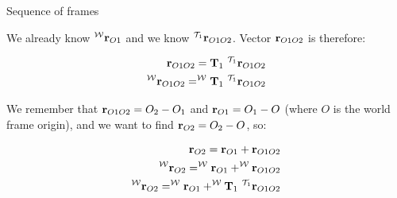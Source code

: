 \documentclass{beamer}
\begin{document}
\begin{frame}{Sequence of frames}
	\begin{flushleft}
		
		We already know $^{\mathcal W}\mathbf{r}_{O1}$ and we know $^{\mathcal T_1}\mathbf{r}_{O1O2}$. Vector $\mathbf{r}_{O1O2}$ is therefore:
		
		\begin{align}
			\mathbf{r}_{O1O2} = \mathbf T_1  \  ^{\mathcal T_1}\mathbf{r}_{O1O2} \\
			^{\mathcal W}\mathbf{r}_{O1O2} = ^{\mathcal W}\mathbf T_1  \  ^{\mathcal T_1}\mathbf{r}_{O1O2} 
		\end{align}
		
		We remember that $\mathbf{r}_{O1O2} = O_2 - O_1$ and $\mathbf{r}_{O1} = O_1 - O$ (where $O$ is the world frame origin), and we want to find $\mathbf{r}_{O2} = O_2 - O$, so:
		
		\begin{align}
			\mathbf{r}_{O2} = \mathbf{r}_{O1} + \mathbf{r}_{O1O2}
			 \\
			^{\mathcal W}\mathbf{r}_{O2} = ^{\mathcal W}\mathbf{r}_{O1} + ^{\mathcal W}\mathbf{r}_{O1O2}
			\\
			^{\mathcal W}\mathbf{r}_{O2} = ^{\mathcal W}\mathbf{r}_{O1} + ^{\mathcal W}\mathbf T_1  \  ^{\mathcal T_1}\mathbf{r}_{O1O2} 
		\end{align}
		
	\end{flushleft}
\end{frame}
\end{document}
